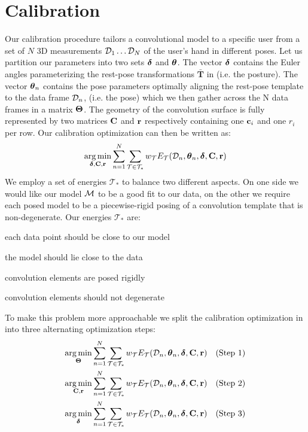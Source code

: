 \section{Calibration}
Our calibration procedure tailors a convolutional model to a specific user from a set of $N$ 3D measurements $\mathcal{D}_1 \dots \mathcal{D}_N$ of the user's hand in different poses. 
% 
% 
Let us partition our parameters into two sets $\boldsymbol{\delta}$ and $\boldsymbol{\theta}$. The vector $\boldsymbol{\delta}$ contains the Euler angles parameterizing the rest-pose transformations $\mathbf{\bar{T}}$ in  (i.e. the posture). The vector $\boldsymbol{\theta}_n$ contains the pose parameters optimally aligning the rest-pose template to the data frame $\mathcal{D}_n$, (i.e. the pose) which we then gather across the N data frames in a matrix $\boldsymbol{\Theta}$. The geometry of the convolution surface is fully represented by two matrices $\mathbf{C}$ and $\mathbf{r}$ respectively containing one $\mathbf{c}_i$ and one $r_i$ per row. Our calibration optimization can then be written as:
% 
\begin{eqnarray}
\operatorname*{arg\,min}_{\boldsymbol{\delta}, \mathbf{C}, \mathbf{r}}
\sum_{n=1}^N 
\sum_{\mathcal{T} \in \mathcal{T}_*} 
w_\mathcal{T} E_\mathcal{T}(\mathcal{D}_n, \boldsymbol{\theta}_n, \boldsymbol{\delta}, \mathbf{C}, \mathbf{r})
\label{eq:calibration}
\end{eqnarray}
% 
We employ a set of energies $\mathcal{T}_*$ to balance two different aspects. On one side we would like our model $\mathcal{M}$ to be a good fit to our data, on the other we require each posed model to be a piecewise-rigid posing of a convolution template that is non-degenerate. Our energies $\mathcal{T}_*$ are:
% 
\begin{description}[labelsep=0em,labelwidth=.4in,labelindent=1cm]
\item[d2m] each data point should be close to our model
\item[m2d] the model should lie close to the data
\item[rigid] convolution elements are posed rigidly
\item[valid] convolution elements should not degenerate
\end{description}
% 
To make this problem more approachable we split the calibration optimization in  into three alternating optimization steps:
% 
\begin{eqnarray}
\operatorname*{arg\,min}_{\boldsymbol{\Theta}} 
\sum_{n=1}^N 
\sum_{\mathcal{T} \in \mathcal{T}_*}
w_\mathcal{T} E_\mathcal{T}(\mathcal{D}_n, \boldsymbol{\theta}_n, \boldsymbol{\delta}, \mathbf{C}, \mathbf{r}) 
&& \text{(Step 1)}
\label{eq:step1}
\\
\operatorname*{arg\,min}_{\mathbf{C}, \mathbf{r}} 
\sum_{n=1}^N 
\sum_{\mathcal{T} \in \mathcal{T}_*}
w_\mathcal{T} E_\mathcal{T}(\mathcal{D}_n, \boldsymbol{\theta}_n, \boldsymbol{\delta}, \mathbf{C}, \mathbf{r})
&& \text{(Step 2)}
\label{eq:step2}
\\
\operatorname*{arg\,min}_{\boldsymbol{\delta}} 
\sum_{n=1}^N 
\sum_{\mathcal{T} \in \mathcal{T}_*}
w_\mathcal{T} E_\mathcal{T}(\mathcal{D}_n, \boldsymbol{\theta}_n, \boldsymbol{\delta}, \mathbf{C}, \mathbf{r}) 
&& \text{(Step 3)}
\label{eq:step3}
\end{eqnarray}
